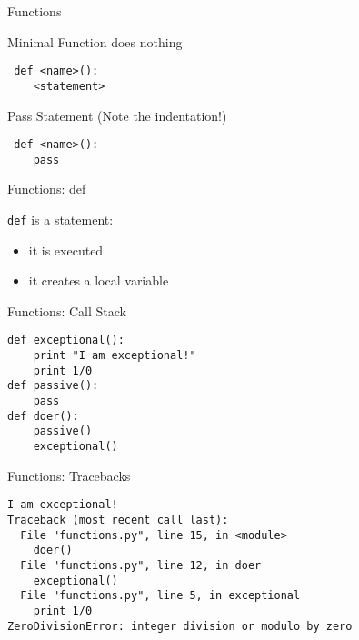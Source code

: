 \documentclass{beamer}
\begin{document}
\begin{frame}[fragile]{Functions}

{\Large Minimal Function does nothing}

\begin{verbatim}
￼def <name>():
    <statement>
\end{verbatim}

\vspace{0.25in}
{\Large Pass Statement (Note the indentation!)}
\begin{verbatim}
￼def <name>():
    pass
\end{verbatim}


\end{frame}

\begin{frame}[fragile]{Functions: def}

{\large \verb+def+ is a statement:}
\begin{itemize}
  \item it is executed
  \item it creates a local variable
\end{itemize}

\vspace{0.2in}{\large￼function defs must be executed before the functions can be called}

\pause
\vspace{0.2in}{\large￼functions call functions -- this makes a stack -- that's all a trace back is}

\end{frame}

\begin{frame}[fragile]{Functions: Call Stack}

\begin{verbatim}
def exceptional():
    print "I am exceptional!"
    print 1/0
def passive():
    pass
def doer():
    passive()
    exceptional()
\end{verbatim}

\end{frame}

\begin{frame}[fragile]{Functions: Tracebacks}

\begin{verbatim}
I am exceptional!
Traceback (most recent call last):
  File "functions.py", line 15, in <module>
    doer()
  File "functions.py", line 12, in doer
    exceptional()
  File "functions.py", line 5, in exceptional
    print 1/0
ZeroDivisionError: integer division or modulo by zero
\end{verbatim}

\end{frame}
\end{document}
